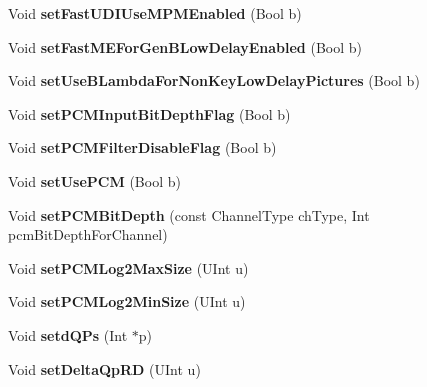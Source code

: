 \begin{DoxyCompactItemize}
Void {\bfseries set\+Fast\+U\+D\+I\+Use\+M\+P\+M\+Enabled} (Bool b)
\item 
\mbox{\label{class_t_enc_cfg_a32722c08f7e649b19997012def9fa8e6}} 
Void {\bfseries set\+Fast\+M\+E\+For\+Gen\+B\+Low\+Delay\+Enabled} (Bool b)
\item 
\mbox{\label{class_t_enc_cfg_aaee0a4178238a2a848672baf13ae8962}} 
Void {\bfseries set\+Use\+B\+Lambda\+For\+Non\+Key\+Low\+Delay\+Pictures} (Bool b)
\item 
\mbox{\label{class_t_enc_cfg_aa7d05690f360eadb939c3d977573d78c}} 
Void {\bfseries set\+P\+C\+M\+Input\+Bit\+Depth\+Flag} (Bool b)
\item 
\mbox{\label{class_t_enc_cfg_a34cce1eb43da941d9ffc70759838b957}} 
Void {\bfseries set\+P\+C\+M\+Filter\+Disable\+Flag} (Bool b)
\item 
\mbox{\label{class_t_enc_cfg_a4d1825d95daf8e00743e91e92594a505}} 
Void {\bfseries set\+Use\+P\+CM} (Bool b)
\item 
\mbox{\label{class_t_enc_cfg_a3f48476a9bcc830d55727c83672aeac0}} 
Void {\bfseries set\+P\+C\+M\+Bit\+Depth} (const Channel\+Type ch\+Type, Int pcm\+Bit\+Depth\+For\+Channel)
\item 
\mbox{\label{class_t_enc_cfg_a1561373ac480aebe7ebd10043ff92aab}} 
Void {\bfseries set\+P\+C\+M\+Log2\+Max\+Size} (U\+Int u)
\item 
\mbox{\label{class_t_enc_cfg_a424b905156315c6bfb8e1b62fccf2b99}} 
Void {\bfseries set\+P\+C\+M\+Log2\+Min\+Size} (U\+Int u)
\item 
\mbox{\label{class_t_enc_cfg_a0c7f6160e48afcb832fc3094807b875a}} 
Void {\bfseries setd\+Q\+Ps} (Int $\ast$p)
\item 
\mbox{\label{class_t_enc_cfg_ab70c7527fd98db9f88b90fc4cf6e0578}} 
Void {\bfseries set\+Delta\+Qp\+RD} (U\+Int u)
\item 
\mbox{\label{class_t_enc_cfg_a3f2e8025f547375c479d05f9f4c14f51}} 

\end{DoxyCompactItemize}
